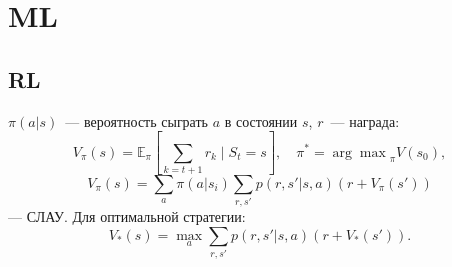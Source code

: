 \section{ML}

\subsection{RL}
$\pi(a\vert s)$~--- вероятность сыграть $a$ в состоянии $s$, $r$~--- награда:
$$V_\pi(s)=\mathbb{E}_\pi\left[\sum_{k=t+1} r_k\;\vert\;S_t=s\right],\quad\pi^*={\arg\max}_\pi V(s_0),$$
$$V_\pi(s)=\sum_a\pi(a\vert s_i)\sum_{r,s'}p(r,s'\vert s,a)(r+V_\pi(s'))$$
--- СЛАУ. Для оптимальной стратегии:
$$V_*(s)=\max_a\sum_{r,s'}p(r,s'\vert s,a)(r+V_*(s')).$$